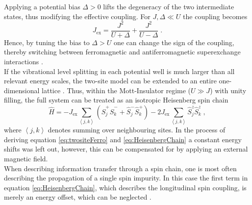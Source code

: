 Applying a potential bias $\Delta > 0$ lifts the degeneracy of the two intermediate states, thus modifying the effective coupling. For $J,\Delta \ll U$ the coupling becomes
\begin{equation}
	J_{\mathrm{ex}} = \frac{J^2}{U + \Delta} + \frac{J^2}{U - \Delta} \; . \label{eq:Jex_delta}
\end{equation}
Hence, by tuning the bias to $\Delta > U$ one can change the sign of the coupling, thereby switching between ferromagnetic and antiferromagnetic superexchange interactions \cite{Trotzky2008}.\\
If the vibrational level splitting in each potential well is much larger than all relevant energy scales, the two-site model can be extended to an entire one-dimensional lattice \cite{Trotzky2008}. Thus, within the Mott-Insulator regime ($U \gg J$) with unity filling, the full system can be treated as an isotropic Heisenberg spin chain
\begin{equation}
	\hat{H} = - J_{\mathrm{ex}} \sum_{\left\langle j, k \right\rangle} \left( \hat{S}_{j}^{+} \hat{S}_{k}^{-} + \hat{S}_{j}^{-} \hat{S}_{k}^{+} \right) - 2 J_{\mathrm{ex}} \sum_{\left\langle j, k \right\rangle} \hat{S}_{j}^{z} \hat{S}_{k}^{z} \; , \label{eq:HeisenbergChain}
\end{equation}
where $\left\langle j, k \right\rangle$ denotes summing over neighbouring sites. In the process of deriving equation \eqref{eq:twositeFerro} and \eqref{eq:HeisenbergChain} a constant energy shifts was left out, however, this can be compensated for by applying an external magnetic field.\\
When describing information transfer through a spin chain, one is most often describing the propagation of a single spin impurity. In this case the first term in equation \ref{eq:HeisenbergChain}, which describes the longitudinal spin coupling, is merely an energy offset, which can be neglected \cite{Fukuhara2013}.  